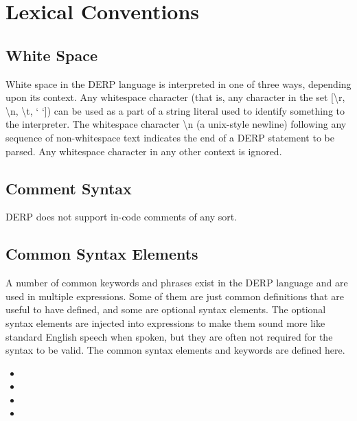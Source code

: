 \section{Lexical Conventions}

\subsection{White Space}
White space in the DERP language is interpreted in one of three ways,
depending upon its context. Any whitespace character (that is, any
character in the set [\textbackslash r, \textbackslash n, \textbackslash t, ‘ ‘]) can be used as a part of a
string literal used to identify something to the interpreter.
The whitespace character \textbackslash n (a unix-style newline) following any sequence
of non-whitespace text indicates the end of a DERP statement to be parsed.
Any whitespace character in any other context is ignored.


\subsection{Comment Syntax}
DERP does not support in-code comments of any sort.

\subsection{Common Syntax Elements}
A number of common keywords and phrases exist in the DERP language and are
used in multiple expressions. Some of them are just common definitions that
are useful to have defined, and some are optional syntax elements.
The optional syntax elements are injected into expressions to make them
sound more like standard English speech when spoken, but they are often not
required for the syntax to be valid. The common syntax elements and keywords
are defined here.

\begin{itemize}[leftmargin=1in]
    \item[\nonterminal{article}] \bnf{:}  \bnf{|}  \bnf{|} 
    \item[\nonterminal{string}] \bnf{:} 
    \item[\nonterminal{digit}] \bnf{:} \bnf{[0-9]}
    \item[\nonterminal{number}] \bnf{:} \bnf{+([.,]}   
\end{itemize}
